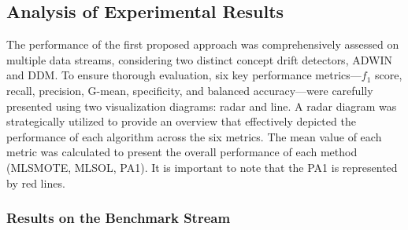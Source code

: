 \subsection{Analysis of Experimental Results}
The performance of the first proposed approach was comprehensively assessed on multiple data streams, considering two distinct concept drift detectors, ADWIN and DDM. To ensure thorough evaluation, six key performance metrics—$f_1$ score, recall, precision, G-mean, specificity, and balanced accuracy—were carefully presented using two visualization diagrams: radar and line. A radar diagram was strategically utilized to provide an overview that effectively depicted the performance of each algorithm across the six metrics. The mean value of each metric was calculated to present the overall performance of each method (MLSMOTE, MLSOL, PA1). It is important to note that the PA1 is represented by red lines.

\subsubsection{Results on the Benchmark Stream}

